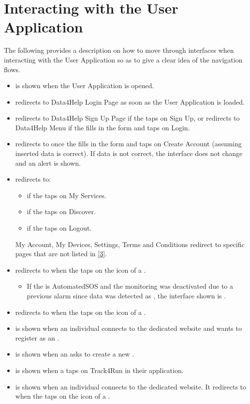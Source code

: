 \documentclass[../DD.tex]{subfiles}
\begin{document}
	\section{Interacting with the User Application}
	The following provides a description on how to move through interfaces when interacting with the User Application so as to give a clear idea of the navigation flows.
	\begin{itemize}
		\item {} is shown when the User Application is opened.
		\item {} redirects to Data4Help Login Page as soon as the User Application is loaded.
		\item {} redirects to Data4Help Sign Up Page if the  taps on Sign Up, or redirects to Data4Help Menu if the  fills in the form and taps on Login.
		\item {} redirects to  once the  fills in the form and taps on Create Account (assuming inserted data is correct). If data is not correct, the interface does not change and an alert is shown.
		\item {} redirects to:
			\begin{itemize}
				\item {} if the  taps on My Services.
				\item {} if the  taps on Discover.
				\item {} if the  taps on Logout.				
			\end{itemize}
			My Account, My Devices, Settings, Terms and Conditions redirect to specific pages that are not listed in \hyperref[ref:3]{[3]}. 
		\item {} redirects to  when the  taps on the icon of a .
			\begin{itemize}
				\item If the  is AutomatedSOS and the monitoring was deactivated due to a previous alarm since data was detected as , the interface shown is .
			\end{itemize}
		\item {} redirects to  when the  taps on the icon of a .
		\item {} is shown when an individual connects to the  dedicated website and wants to register as an .
		\item {} is shown when an  asks to create a new .
		\item {} is shown when a  taps on Track4Run in their application.
		\item {} is shown when an individual connects to the  dedicated website. It redirects to  when the  taps on the icon of a .
	\end{itemize}
\thispagestyle{fancy}
 
\end{document}
